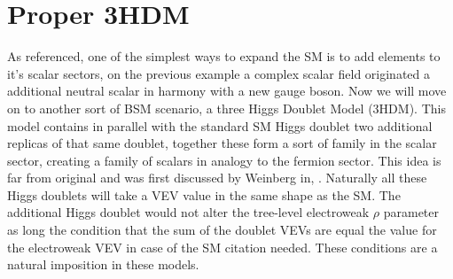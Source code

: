 
\newpage 

\chapter{Proper 3HDM}


% 
% 

As referenced, one of the simplest ways to expand the SM is to add elements to it's scalar sectors, on the previous example a complex scalar field originated a additional neutral scalar in harmony with a new gauge boson.
%
Now we will move on to another sort of BSM scenario, 
%
%
a three Higgs Doublet Model (3HDM). 
%
This model contains in parallel with the standard SM Higgs doublet two additional replicas of that same doublet, together these form a sort of family in the scalar sector, creating a family of scalars in analogy to the fermion sector. 
%
This idea is far from original and was first discussed by Weinberg in, \cite{Weinberg1976}.
% 
Naturally all these Higgs doublets will take a VEV value in the same shape as the SM. 
%
The additional Higgs doublet would not alter the tree-level electroweak $\rho$ parameter as long the condition that the sum of the doublet VEVs are equal the value for the electroweak VEV in case of the SM {\color{blue} citation needed}. 
%
These conditions are a natural imposition in these models. 


